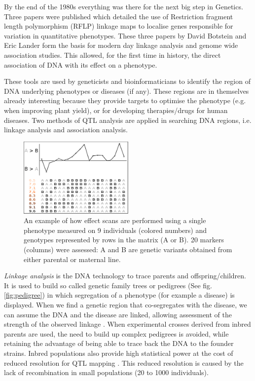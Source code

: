 By the end of the 1980s everything was there for the next big step in Genetics. Three papers were published which detailed 
the use of Restriction fragment length polymorphism (RFLP) linkage maps to localise genes responsible for variation in 
quantitative phenotypes. These three papers by David Botstein and Eric Lander \cite{Lander:1986, Lander:1987, Lander:1989} 
form the basis for modern day linkage analysis and genome wide association studies. This allowed, for the first time in 
history, the direct association of DNA with its effect on a phenotype. 

These tools are used by geneticists and bioinformaticians to identify the region of DNA underlying phenotypes or diseases 
(if any). These regions are in themselves already interesting because they provide targets to optimise the phenotype (e.g. 
when improving plant yield), or for developing therapies/drugs for human diseases. Two methods of QTL analysis are applied 
in searching  DNA regions, i.e. linkage analysis and association analysis. 

\begin{figure}
  \centering
  \includegraphics[width=0.5\textwidth]{eps/image_1_1}
  \caption[Effect scan across the genome.]
    {An example of how effect scans are performed using a single phenotype measured on 9 individuals (colored numbers)
    and genotypes represented by rows in the matrix (A or B). 20 markers (columns) were assessed: A and B are genetic 
    variants obtained from either parental or maternal line. }
    \label{fig:effectscan}
\end{figure}

\emph{Linkage analysis} is the DNA technology to trace parents and offspring/children. It is used to build so called genetic 
family trees or pedigrees (See fig. \ref{fig:pedigree}) in which segregation of a phenotype (for example a disease) is 
displayed. When we find a genetic region that co-segregates with the disease, we can assume the DNA and the disease are 
linked, allowing assessment of the strength of the observed linkage \cite{Rosyara:2009}. When experimental crosses derived 
from inbred parents are used, the need to build up complex pedigrees is avoided, while retaining the advantage of being able 
to trace back the DNA to the founder strains. Inbred populations also provide high statistical power at the cost of reduced 
resolution for QTL mapping \cite{Jansen:2001a}. This reduced resolution is caused by the lack of recombination in small 
populations (20 to 1000 individuals). 


